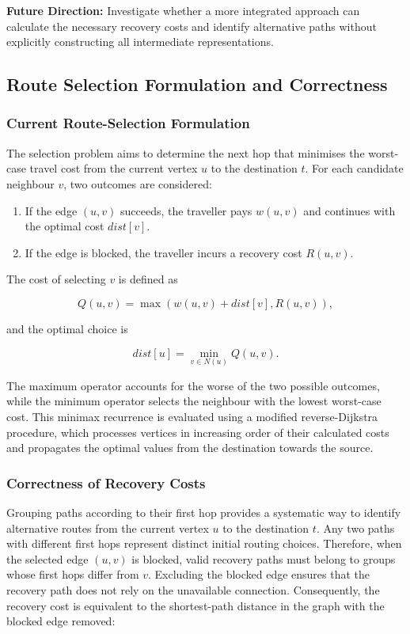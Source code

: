 \documentclass{article}
\begin{document}
\textbf{Future Direction:} Investigate whether a more integrated approach can calculate the necessary recovery costs and identify alternative paths without explicitly constructing all intermediate representations.

\subsection{Route Selection Formulation and Correctness}

\subsubsection{Current Route-Selection Formulation}

The selection problem aims to determine the next hop that minimises the worst-case travel cost from the current vertex $u$ to the destination $t$. For each candidate neighbour $v$, two outcomes are considered:

\begin{enumerate}
    \item If the edge $(u,v)$ succeeds, the traveller pays $w(u,v)$ and continues with the optimal cost $dist[v]$.
    \item If the edge is blocked, the traveller incurs a recovery cost $R(u,v)$.
\end{enumerate}

The cost of selecting $v$ is defined as

\[
Q(u,v)=\max\left(w(u,v)+dist[v],R(u,v)\right),
\]

and the optimal choice is

\[
dist[u]=\min_{v\in N(u)}Q(u,v).
\]

The maximum operator accounts for the worse of the two possible outcomes, while the minimum operator selects the neighbour with the lowest worst-case cost. This minimax recurrence is evaluated using a modified reverse-Dijkstra procedure, which processes vertices in increasing order of their calculated costs and propagates the optimal values from the destination towards the source.

\subsubsection{Correctness of Recovery Costs}

Grouping paths according to their first hop provides a systematic way to identify alternative routes from the current vertex $u$ to the destination $t$. Any two paths with different first hops represent distinct initial routing choices. Therefore, when the selected edge $(u,v)$ is blocked, valid recovery paths must belong to groups whose first hops differ from $v$. Excluding the blocked edge ensures that the recovery path does not rely on the unavailable connection. Consequently, the recovery cost is equivalent to the shortest-path distance in the graph with the blocked edge removed:
\end{document}
